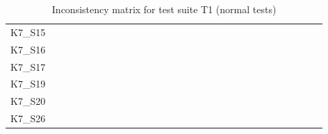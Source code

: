 \begin{table}[htpb]
\begin{tabular}{l|rrrrrrrrrrrrrrrrrrrrrrrrrrrr}
        K7\_S15 & \n & \n & \n & \n & \n & \n & \n & \n & \n & \n & \n & \n & \n & \n & \n & \n & \n & \n & \n & \n & \n & \n & \n & \n & \n & \n & \n & \n \\
        K7\_S16 & \n & \n & \n & \e & \n & \n & \n & \n & \n & \n & \n & \n & \n & \n & \n & \n & \n & \n & \n & \n & \n & \n & \n & \n & \n & \n & \n & \n \\
        K7\_S17 & \n & \n & \n & \n & \n & \n & \n & \n & \n & \n & \n & \n & \n & \n & \n & \n & \n & \n & \e & \n & \e & \n & \e & \e & \n & \n & \n & \n \\
        K7\_S19 & \n & \n & \n & \n & \n & \n & \n & \n & \n & \n & \n & \n & \n & \n & \n & \n & \n & \n & \n & \n & \n & \n & \n & \n & \n & \n & \n & \n \\
        K7\_S20 & \n & \n & \n & \n & \n & \n & \n & \n & \n & \n & \n & \n & \n & \n & \n & \n & \n & \n & \n & \n & \n & \n & \n & \n & \n & \n & \n & \n \\
        K7\_S26 & \n & \n & \n & \n & \n & \n & \n & \n & \n & \n & \n & \n & \n & \n & \n & \n & \n & \n & \n & \n & \n & \n & \n & \n & \n & \n & \n & \n \\
        \bottomrule
    \end{tabular}
    \caption{Inconsistency matrix for test suite T1 (normal tests)}
    \label{tab:inconsistencies_matrix_normal}
    \setlength{\tabcolsep}{\defaulttabcolsep}
\end{table}

